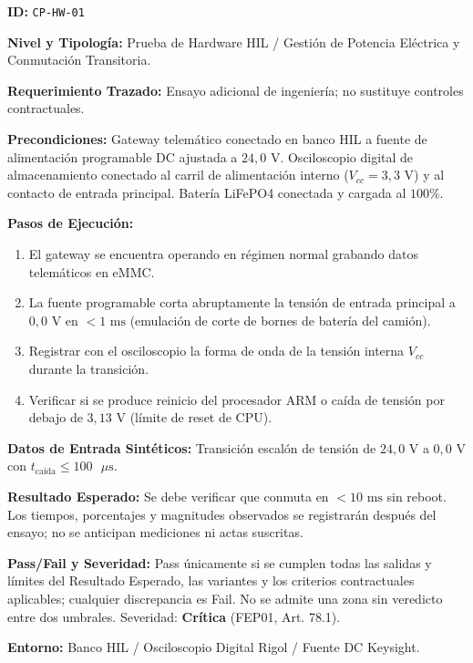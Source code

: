 \par\noindent\textbf{ID:} \texttt{C\allowbreak{}P\allowbreak{}-\allowbreak{}H\allowbreak{}W\allowbreak{}-\allowbreak{}0\allowbreak{}1\allowbreak{}}\par
\par\noindent\textbf{Nivel y Tipología:} Prueba de Hardware HIL / Gestión de Potencia Eléctrica y Conmutación Transitoria.\par
\par\noindent\textbf{Requerimiento Trazado:} Ensayo adicional de ingeniería; no sustituye controles contractuales.\par
\par\noindent\textbf{Precondiciones:} Gateway telemático conectado en banco HIL a fuente de alimentación programable DC ajustada a \(24{,}0\text{ V}\). Osciloscopio digital de almacenamiento conectado al carril de alimentación interno (\(V_{cc} = 3{,}3\text{ V}\)) y al contacto de entrada principal. Batería LiFePO4 conectada y cargada al \(100\%\).\par
\par\noindent\textbf{Pasos de Ejecución:} \par
\begin{enumerate}
\item El gateway se encuentra operando en régimen normal grabando datos telemáticos en eMMC.
\item La fuente programable corta abruptamente la tensión de entrada principal a \(0{,}0\text{ V}\) en \(< 1\text{ ms}\) (emulación de corte de bornes de batería del camión).
\item Registrar con el osciloscopio la forma de onda de la tensión interna \(V_{cc}\) durante la transición.
\item Verificar si se produce reinicio del procesador ARM o caída de tensión por debajo de \(3{,}13\text{ V}\) (límite de reset de CPU).
\end{enumerate}
\par\noindent\textbf{Datos de Entrada Sintéticos:} Transición escalón de tensión de \(24{,}0\text{ V}\) a \(0{,}0\text{ V}\) con \(t_{\mbox{caída}} \le 100\text{ }\mu\text{s}\).\par
\par\noindent\textbf{Resultado Esperado:} Se debe verificar que conmuta en \(< 10\text{ ms}\) sin reboot. Los tiempos, porcentajes y magnitudes observados se registrarán después del ensayo; no se anticipan mediciones ni actas suscritas.\par
\par\noindent\textbf{Pass/Fail y Severidad:} Pass únicamente si se cumplen todas las salidas y límites del Resultado Esperado, las variantes y los criterios contractuales aplicables; cualquier discrepancia es Fail. No se admite una zona sin veredicto entre dos umbrales. Severidad: \textbf{Crítica} (FEP01, Art. 78.1).\par
\par\noindent\textbf{Entorno:} Banco HIL / Osciloscopio Digital Rigol / Fuente DC Keysight.\par






